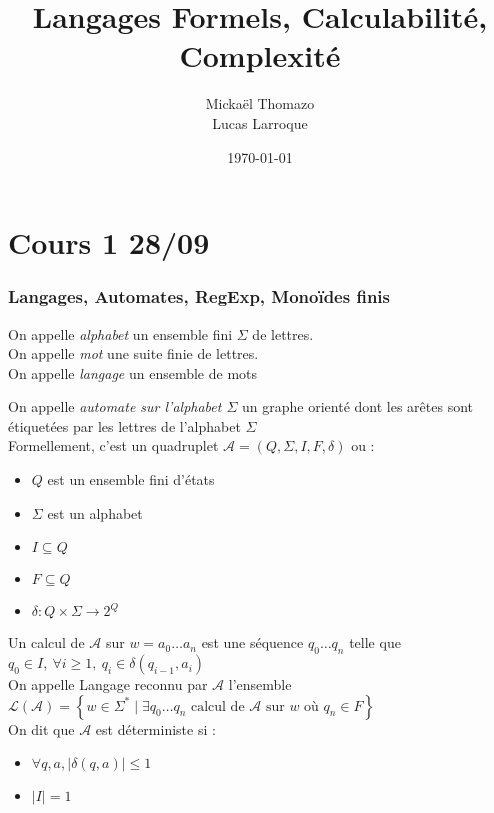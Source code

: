 \documentclass{cours}
\title{Langages Formels, Calculabilité, Complexité}
\author{Mickaël Thomazo \\ \small{Lucas Larroque}}
\date{\today}
\begin{document}
\part[Langages Réguliers]{Cours 1 28/09}
\section{Langages, Automates, RegExp, Monoïdes finis}
\begin{definition}
    On appelle \emph{alphabet} un ensemble fini $\Sigma$ de lettres. \\
    On appelle \emph{mot} une suite finie de lettres. \\
    On appelle \emph{langage} un ensemble de mots
\end{definition}
\begin{definition}
    On appelle \emph{automate sur l'alphabet $\Sigma$} un graphe orienté dont les arêtes sont étiquetées par les lettres de l'alphabet $\Sigma$\\
    Formellement, c'est un quadruplet $\mathcal{A} = (Q, \Sigma, I, F, \delta)$ ou : \begin{itemize}
        \item $Q$ est un ensemble fini d'états
        \item $\Sigma$ est un alphabet
        \item $I \subseteq Q$
        \item $F \subseteq Q$
        \item $\delta : Q \times \Sigma \rightarrow 2^{Q}$
    \end{itemize}

    Un calcul de $\mathcal{A}$ sur $w = a_{0}\ldots a_{n}$ est une séquence $q_{0}\ldots q_{n}$ telle que $q_{0} \in I, \ \forall i \geq 1,\ q_{i} \in \delta(q_{i-1}, a_{i})$\\
    On appelle Langage reconnu par $\mathcal{A}$ l'ensemble $\mathcal{L}(\mathcal{A}) =  \left\{w \in \Sigma^{*} \mid \exists q_{0}\ldots q_{n} \text{ calcul de } \mathcal{A} \text{ sur } w \text{ où } q_{n} \in F\right\}$\\
    On dit que $\mathcal{A}$ est déterministe si :\begin{itemize}
        \item $\forall q, a, \left| \delta(q, a)\right| \leq 1$
        \item $\left| I\right| = 1$
    \end{itemize} 
\end{definition}
\end{document}
